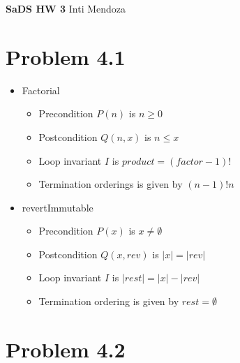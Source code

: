 \documentclass[11pt]{article}
\begin{document}
\huge \textbf{SaDS HW 3} 
\large \hfill Inti Mendoza \\

\section*{Problem 4.1}

\begin{itemize}
	\item Factorial
	\begin{itemize}
		\item Precondition $P(n)$ is $n \geq 0$ 
		\item Postcondition $Q(n, x)$ is $n \leq x$
		\item Loop invariant $I$ is $product = (factor - 1)!$
		\item Termination orderings is given by $(n-1)!n$	
	\end{itemize}
	\item revertImmutable
	\begin{itemize}
		\item Precondition $P(x)$ is $x \neq \emptyset$
		\item Postcondition $Q(x, rev)$ is $|x| = |rev|$
		\item Loop invariant $I$ is $|rest| = |x| - |rev|$
		\item Termination ordering is given by $rest = \emptyset$
	\end{itemize}
\end{itemize}

\section*{Problem 4.2}
\end{document}

